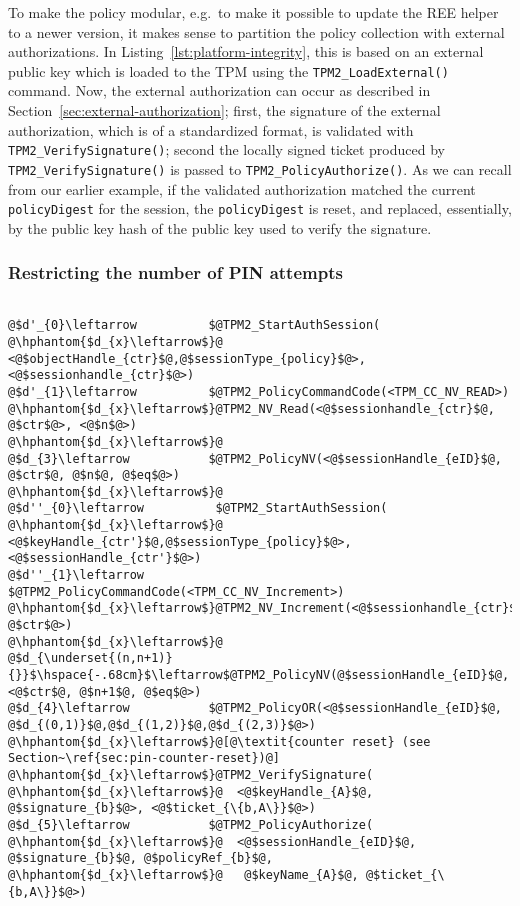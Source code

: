 \documentclass{sig-alternate-2013}
\begin{document}
To make the policy modular, e.g.\ to make it possible to update the REE helper
to a newer version, it makes sense to partition the policy collection with
external authorizations. In Listing~\ref{lst:platform-integrity}, this is based
on an external public key which is loaded to the TPM using the
\texttt{TPM2\_LoadExternal()} command. Now, the external authorization can occur
as described in Section~\ref{sec:external-authorization}; first, the signature
of the external authorization, which is of a standardized format, is validated
with \texttt{TPM2\_VerifySignature()}; second the locally signed ticket produced
by \texttt{TPM2\_VerifySignature()} is passed to
\texttt{TPM2\_PolicyAuthorize()}.  As we can recall from our earlier example, if
the validated authorization matched the current \texttt{policyDigest} for the
session, the \texttt{policyDigest} is reset, and replaced, essentially, by the
public key hash of the public key used to verify the signature.

\subsubsection{Restricting the number of PIN attempts}
\label{sec:pin-attempts}

\begin{lstlisting}[float=tb,label={lst:pin-attempts},
caption={PIN attempt restriction policy fragment}]

@$d'_{0}\leftarrow          $@TPM2_StartAuthSession(
@\hphantom{$d_{x}\leftarrow$}@  <@$objectHandle_{ctr}$@,@$sessionType_{policy}$@>, <@$sessionhandle_{ctr}$@>)
@$d'_{1}\leftarrow          $@TPM2_PolicyCommandCode(<TPM_CC_NV_READ>)
@\hphantom{$d_{x}\leftarrow$}@TPM2_NV_Read(<@$sessionhandle_{ctr}$@, @$ctr$@>, <@$n$@>)
@\hphantom{$d_{x}\leftarrow$}@
@$d_{3}\leftarrow           $@TPM2_PolicyNV(<@$sessionHandle_{eID}$@, @$ctr$@, @$n$@, @$eq$@>)
@\hphantom{$d_{x}\leftarrow$}@
@$d''_{0}\leftarrow          $@TPM2_StartAuthSession(
@\hphantom{$d_{x}\leftarrow$}@  <@$keyHandle_{ctr'}$@,@$sessionType_{policy}$@>, <@$sessionHandle_{ctr'}$@>)
@$d''_{1}\leftarrow         $@TPM2_PolicyCommandCode(<TPM_CC_NV_Increment>)
@\hphantom{$d_{x}\leftarrow$}@TPM2_NV_Increment(<@$sessionhandle_{ctr}$@, @$ctr$@>)
@\hphantom{$d_{x}\leftarrow$}@
@$d_{\underset{(n,n+1)}{}}$\hspace{-.68cm}$\leftarrow$@TPM2_PolicyNV(@$sessionHandle_{eID}$@, <@$ctr$@, @$n+1$@, @$eq$@>)
@$d_{4}\leftarrow           $@TPM2_PolicyOR(<@$sessionHandle_{eID}$@, @$d_{(0,1)}$@,@$d_{(1,2)}$@,@$d_{(2,3)}$@>)
@\hphantom{$d_{x}\leftarrow$}@[@\textit{counter reset} (see Section~\ref{sec:pin-counter-reset})@]
@\hphantom{$d_{x}\leftarrow$}@TPM2_VerifySignature(
@\hphantom{$d_{x}\leftarrow$}@  <@$keyHandle_{A}$@, @$signature_{b}$@>, <@$ticket_{\{b,A\}}$@>)
@$d_{5}\leftarrow           $@TPM2_PolicyAuthorize(
@\hphantom{$d_{x}\leftarrow$}@  <@$sessionHandle_{eID}$@, @$signature_{b}$@, @$policyRef_{b}$@,
@\hphantom{$d_{x}\leftarrow$}@   @$keyName_{A}$@, @$ticket_{\{b,A\}}$@>)
\end{lstlisting}
\end{document}

